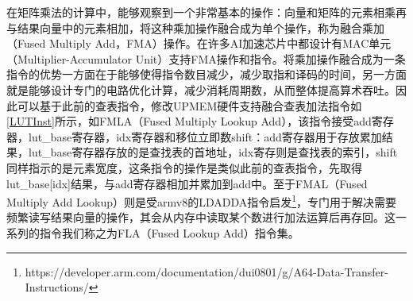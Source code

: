 在矩阵乘法的计算中，能够观察到一个非常基本的操作：向量和矩阵的元素相乘再与结果向量中的元素相加，将这种乘加操作融合成为单个操作，称为融合乘加（Fused Multiply Add，FMA）操作。在许多AI加速芯片中都设计有MAC单元（Multiplier-Accumulator Unit）支持FMA操作和指令。将乘加操作融合成为一条指令的优势一方面在于能够使得指令数目减少，减少取指和译码的时间，另一方面就是能够设计专门的电路优化计算，减少消耗周期数，从而整体提高算术吞吐。因此可以基于此前的查表指令，修改UPMEM硬件支持融合查表加法指令如\ref{LUTInst}所示，如FMLA（Fused Multiply Lookup Add），该指令接受add寄存器，lut\_base寄存器，idx寄存器和移位立即数shift：add寄存器用于存放累加结果，lut\_base寄存器存放的是查找表的首地址，idx寄存则是查找表的索引，shift同样指示的是元素宽度，这条指令的操作是类似此前的查表指令，先取得lut\_base[idx]结果，与add寄存器相加并累加到add中。至于FMAL（Fused Multiply Add Lookup）则是受armv8的LDADDA指令启发\footnote{https://developer.arm.com/documentation/dui0801/g/A64-Data-Transfer-Instructions/}，专门用于解决需要频繁读写结果向量的操作，其会从内存中读取某个数进行加法运算后再存回。这一系列的指令我们称之为FLA（Fused Lookup Add）指令集。

